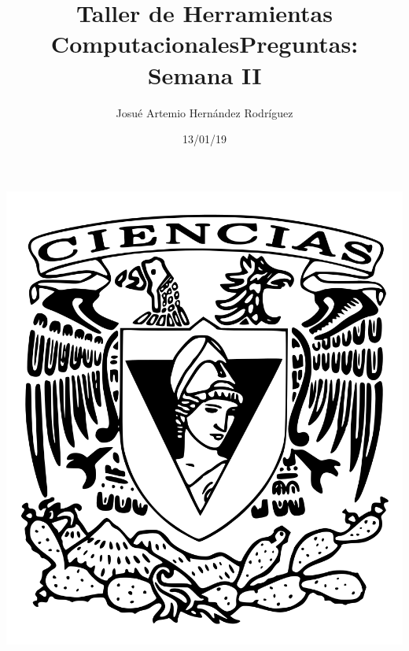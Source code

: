 \documentclass[letterpaper, 12pt, oneside]{article}%
\title{\Huge Taller de Herramientas Computacionales}
\author{Josué Artemio Hernández Rodríguez}%
\date{13/01/19}%
\begin{document}
\maketitle
\begin{center}%
\includegraphics[scale=0.2]{2.png}%
\end{center}%
\newpage%

\title{\huge Preguntas: Semana II\\}%
\end{document}

